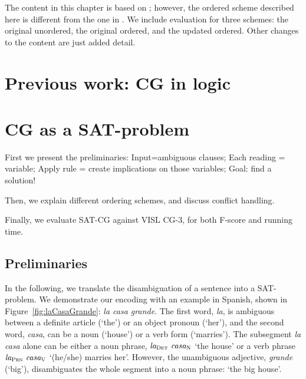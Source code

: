 The content in this chapter is based on \cite{listenmaa_claessen2015}; 
however, the ordered scheme described here is different from the one in \cite{listenmaa_claessen2015}.
We include evaluation for three schemes: the original unordered, the original ordered, and the updated ordered.
Other changes to the content are just added detail.



\section{Previous work: CG in logic}\label{encoding-in-logic}




\section{CG as a SAT-problem}
\label{sec:CGSAT}

First we present the preliminaries: Input=ambiguous clauses; Each reading = variable; Apply rule = create implications on those variables; Goal: find a solution!

Then, we explain different ordering schemes, and discuss conflict handling.

Finally, we evaluate SAT-CG against VISL CG-3, for both F-score and running time.

\subsection{Preliminaries}

In the following, we translate the disambiguation of a sentence into a SAT-problem.
We demonstrate our encoding with an example in Spanish, shown in Figure~\ref{fig:laCasaGrande}: {\em la casa grande}. %
The first word, {\em la}, is ambiguous between a definite article (`the') or an object pronoun (`her'), and the second word, {\em casa}, can be a noun (`house') or a verb form (`marries').
The subsegment {\em la casa} alone can be either a noun phrase, $\text{\em la}_{\text{\sc Det}} \ \text{\em casa}_{\text{\sc N}}$ 
`the house'  or a verb phrase $\text{\em la}_{\text{\sc Prn}} \ \text{\em casa}_{\text{\sc V}}$   `(he/she) marries her'. 
However, the unambiguous adjective, {\em grande} (`big'), disambiguates the whole segment into a noun phrase: `the big house'.

